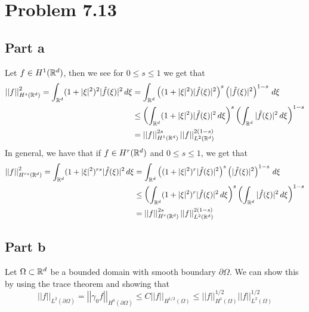 \documentclass[12pt]{report}
\newcommand{\norm}[1]{\left|\left|#1\right|\right|}
\begin{document}
\section*{Problem 7.13}
\subsection*{Part a}
Let $f \in H^1(\mathbb{R}^d)$, then we see for $0 \leq s \leq 1$ we get that
\begin{align*}
  \norm{f}^2_{H^s(\R^d)} = \int_{\R^d} (1 + |\xi|^2)^2 |\hat{f}(\xi)|^2 \, d\xi &= \int_{\R^d} \left((1 + |\xi|^2) |\hat{f}(\xi)|^2\right)^s \left(|\hat{f}(\xi)|^2\right)^{1-s} \, d\xi \\
                                                                                &\leq \left(\int_{\R^d} (1 + |\xi|^2) |\hat{f}(\xi)|^2 \, d\xi\right)^s \left(\int_{\R^d} |\hat{f}(\xi)|^2 \, d\xi\right)^{1-s} \\
                                                                                &= \norm{f}^{2s}_{H^1(\R^d)} \norm{f}^{2(1-s)}_{L^2(\R^d)}
\end{align*}
In general, we have that if $f \in H^r(\mathbb{R}^d)$ and $0 \leq s \leq 1$, we get that 
\begin{align*}
  \norm{f}^2_{H^{rs}(\R^d)} = \int_{\R^d} (1 + |\xi|^2)^{rs} |\hat{f}(\xi)|^2 \, d\xi &= \int_{\R^d} \left((1 + |\xi|^2)^r |\hat{f}(\xi)|^2\right)^{s} \left(|\hat{f}(\xi)|^2\right)^{1-s} \, d\xi \\
                                                                                      &\leq \left(\int_{\R^d} (1 + |\xi|^2)^r |\hat{f}(\xi)|^2 \, d\xi\right)^s \left(\int_{\R^d} |\hat{f}(\xi)|^2 \, d\xi\right)^{1-s} \\
                                                                                      &= \norm{f}^{2s}_{H^r(\R^d)} \norm{f}^{2(1-s)}_{L^2(\R^d)}
\end{align*}
\subsection*{Part b}
Let $\Omega \subset \mathbb{R}^d$ be a bounded domain with smooth boundary $\partial \Omega$. We can show this by using the trace theorem and showing that
\begin{equation*}
  \norm{f}_{L^2(\partial \Omega)} = \norm{\gamma_0 f}_{H^{0}(\partial \Omega)} \leq C \norm{f}_{H^{1/2}(\Omega)} \leq \norm{f}^{1/2}_{H^1(\Omega)} \norm{f}^{1/2}_{L^2(\Omega)}
\end{equation*}
\end{document}
